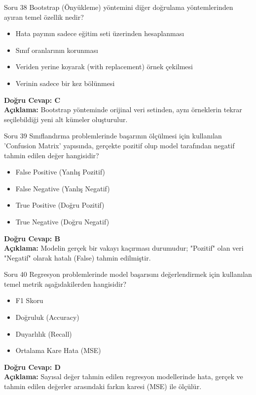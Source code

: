 \documentclass[12pt,a4paper]{article}
\begin{document}
\begin{testcard}{Soru 38}
    Bootstrap (Önyükleme) yöntemini diğer doğrulama yöntemlerinden ayıran temel özellik nedir?
    \begin{itemize}
        \item[A)] Hata payının sadece eğitim seti üzerinden hesaplanması
        \item[B)] Sınıf oranlarının korunması
        \item[C)] Veriden yerine koyarak (with replacement) örnek çekilmesi
        \item[D)] Verinin sadece bir kez bölünmesi
    \end{itemize}
    \tcblower
    \textbf{Doğru Cevap: C} \\
    \textbf{Açıklama:} Bootstrap yönteminde orijinal veri setinden, aynı örneklerin tekrar seçilebildiği yeni alt kümeler oluşturulur.
\end{testcard}

\begin{testcard}{Soru 39}
    Sınıflandırma problemlerinde başarının ölçülmesi için kullanılan 'Confusion Matrix' yapısında, gerçekte pozitif olup model tarafından negatif tahmin edilen değer hangisidir?
    \begin{itemize}
        \item[A)] False Positive (Yanlış Pozitif)
        \item[B)] False Negative (Yanlış Negatif)
        \item[C)] True Positive (Doğru Pozitif)
        \item[D)] True Negative (Doğru Negatif)
    \end{itemize}
    \tcblower
    \textbf{Doğru Cevap: B} \\
    \textbf{Açıklama:} Modelin gerçek bir vakayı kaçırması durumudur; "Pozitif" olan veri "Negatif" olarak hatalı (False) tahmin edilmiştir.
\end{testcard}

\begin{testcard}{Soru 40}
    Regresyon problemlerinde model başarısını değerlendirmek için kullanılan temel metrik aşağıdakilerden hangisidir?
    \begin{itemize}
        \item[A)] F1 Skoru
        \item[B)] Doğruluk (Accuracy)
        \item[C)] Duyarlılık (Recall)
        \item[D)] Ortalama Kare Hata (MSE)
    \end{itemize}
    \tcblower
    \textbf{Doğru Cevap: D} \\
    \textbf{Açıklama:} Sayısal değer tahmin edilen regresyon modellerinde hata, gerçek ve tahmin edilen değerler arasındaki farkın karesi (MSE) ile ölçülür.
\end{testcard}
\end{document}
